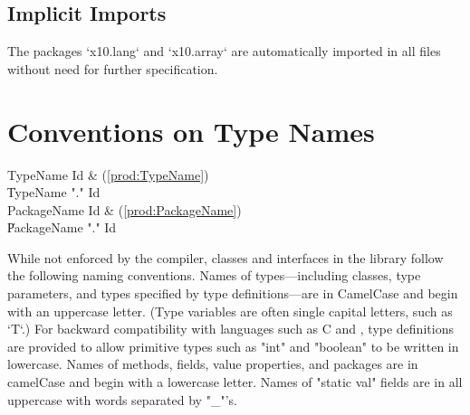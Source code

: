 \subsection{Implicit Imports}

The packages \xcd`x10.lang` and \xcd`x10.array` are automatically imported in all files
without need for further specification.




\section{Conventions on Type Names}

\begin{bbgrammar}
            TypeName \: Id & (\ref{prod:TypeName}) \\
                    \| TypeName \xcd"." Id \\
         PackageName \: Id & (\ref{prod:PackageName}) \\
                    \| PackageName \xcd"." Id \\
\end{bbgrammar}


While not enforced by the compiler, classes and interfaces
in the \Xten{} library follow the following naming conventions.
Names of types---including classes,
type parameters, and types specified by type definitions---are in
CamelCase and begin with an uppercase letter.  (Type variables are often
single capital letters, such as \xcd`T`.)
For backward
compatibility with languages such as C and \java{}, type
definitions are provided to allow primitive types
such as \xcd"int" and \xcd"boolean" to be written in lowercase.
Names of methods, fields, value properties, and packages are in camelCase and
begin with a lowercase letter. 
Names of \xcd"static val" fields are in all uppercase with words
separated by \xcd"_"'s.
